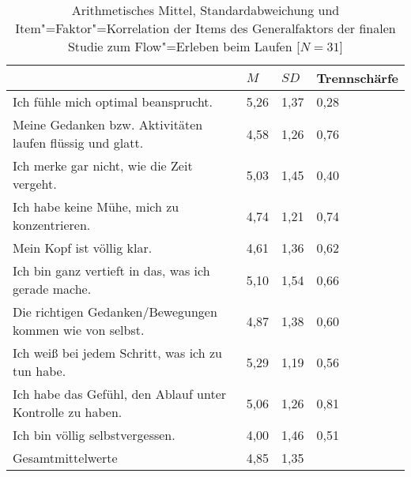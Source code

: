 \newpage
\begin{table}
	[!htb] \centering \caption[Item"=Faktor"=Korrelation der Items des Generalfaktors (Finale Studie: Laufen)]{Arithmetisches Mittel, Standardabweichung und Item"=Faktor"=Korrelation der Items des Generalfaktors der finalen Studie zum Flow"=Erleben beim Laufen [$N = 31$]} \label{tab:generalfaktor_3} 
	\begin{tabularx}
		{ 
		\textwidth}{p{} p{} p{} p{}} \toprule & $M$ & $SD$ & Trennschärfe \\
		\midrule Ich fühle mich optimal beansprucht. & 5,26 & 1,37 & 0,28 \\
		Meine Gedanken bzw. Aktivitäten laufen flüssig und glatt. & 4,58 & 1,26 & 0,76 \\
		Ich merke gar nicht, wie die Zeit vergeht. & 5,03 & 1,45 & 0,40 \\
		Ich habe keine Mühe, mich zu konzentrieren. & 4,74 & 1,21 & 0,74 \\
		Mein Kopf ist völlig klar. & 4,61 & 1,36 & 0,62 \\
		Ich bin ganz vertieft in das, was ich gerade mache. & 5,10 & 1,54 & 0,66 \\
		Die richtigen Gedanken/Bewegungen kommen wie von selbst. & 4,87 & 1,38 & 0,60 \\
		Ich weiß bei jedem Schritt, was ich zu tun habe. & 5,29 & 1,19 & 0,56 \\
		Ich habe das Gefühl, den Ablauf unter Kontrolle zu haben. & 5,06 & 1,26 & 0,81 \\
		Ich bin völlig selbstvergessen. & 4,00 & 1,46 & 0,51 \\
		Gesamtmittelwerte & 4,85 & 1,35 & \\
		\bottomrule 
	\end{tabularx}
\end{table}
